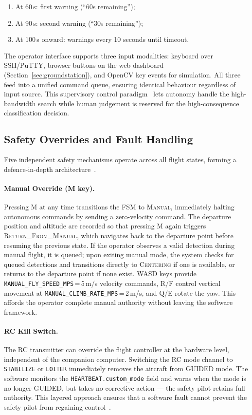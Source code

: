 \begin{enumerate}
    \item At 60\,s: first warning (``60s remaining'');
    \item At 90\,s: second warning (``30s remaining'');
    \item At 100\,s onward: warnings every 10 seconds until timeout.
\end{enumerate}

The operator interface supports three input modalities: keyboard over SSH/PuTTY, browser buttons on the web dashboard (Section~\ref{sec:groundstation}), and OpenCV key events for simulation. All three feed into a unified command queue, ensuring identical behaviour regardless of input source. This supervisory control paradigm~\cite{goodrich2007human} lets autonomy handle the high-bandwidth search while human judgement is reserved for the high-consequence classification decision.

\subsection{Safety Overrides and Fault Handling}\label{subsec:safety}

Five independent safety mechanisms operate across all flight states, forming a defence-in-depth architecture~\cite{ardupilot_failsafe}.

\paragraph{Manual Override (M key).}
Pressing M at any time transitions the FSM to \textsc{Manual}, immediately halting autonomous commands by sending a zero-velocity command. The departure position and altitude are recorded so that pressing M again triggers \textsc{Return\_From\_Manual}, which navigates back to the departure point before resuming the previous state. If the operator observes a valid detection during manual flight, it is queued; upon exiting manual mode, the system checks for queued detections and transitions directly to \textsc{Centering} if one is available, or returns to the departure point if none exist. WASD keys provide \texttt{MANUAL\_FLY\_SPEED\_MPS}\,=\,5\,m/s velocity commands, R/F control vertical movement at \texttt{MANUAL\_CLIMB\_RATE\_MPS}\,=\,2\,m/s, and Q/E rotate the yaw. This affords the operator complete manual authority without leaving the software framework.

\paragraph{RC Kill Switch.}
The RC transmitter can override the flight controller at the hardware level, independent of the companion computer. Switching the RC mode channel to \texttt{STABILIZE} or \texttt{LOITER} immediately removes the aircraft from GUIDED mode. The software monitors the \texttt{HEARTBEAT.custom\_mode} field and warns when the mode is no longer GUIDED, but takes no corrective action --- the safety pilot retains full authority. This layered approach ensures that a software fault cannot prevent the safety pilot from regaining control~\cite{ardupilot_failsafe}.

